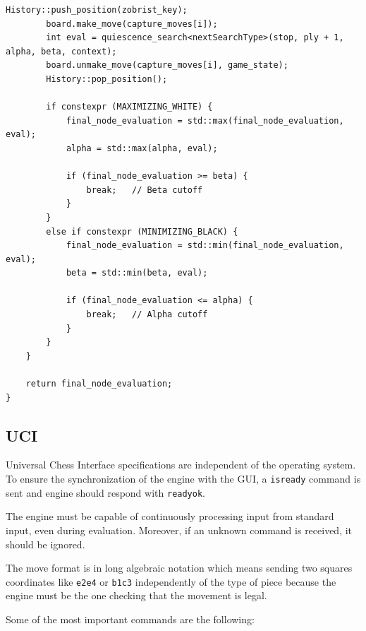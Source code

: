 \begin{lstlisting}[breaklines=true, frame=single, caption={Quiescence search implementation.}]
        History::push_position(zobrist_key);
        board.make_move(capture_moves[i]);
        int eval = quiescence_search<nextSearchType>(stop, ply + 1, alpha, beta, context);
        board.unmake_move(capture_moves[i], game_state);
        History::pop_position();

        if constexpr (MAXIMIZING_WHITE) {
            final_node_evaluation = std::max(final_node_evaluation, eval);
            alpha = std::max(alpha, eval);

            if (final_node_evaluation >= beta) {
                break;   // Beta cutoff
            }
        }
        else if constexpr (MINIMIZING_BLACK) {
            final_node_evaluation = std::min(final_node_evaluation, eval);
            beta = std::min(beta, eval);

            if (final_node_evaluation <= alpha) {
                break;   // Alpha cutoff
            }
        }
    }

    return final_node_evaluation;
}
\end{lstlisting}

\subsection{UCI}

Universal Chess Interface specifications are independent of the operating system. To ensure the synchronization of the engine with the GUI, a \texttt{isready} command is sent and engine should respond with \texttt{readyok}.

\vspace{1em}

\noindent The engine must be capable of continuously processing input from standard input, even during evaluation. Moreover, if an unknown command is received, it should be ignored.

\vspace{1em}

\noindent The move format is in long algebraic notation which means sending two squares coordinates like \texttt{e2e4} or \texttt{b1c3} independently of the type of piece because the engine must be the one checking that the movement is legal.

\vspace{1em}

\noindent Some of the most important commands are the following:


